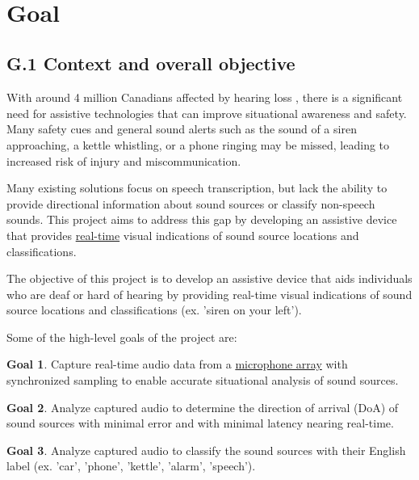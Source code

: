 \documentclass[12pt]{article}
\theoremstyle{definition}
\newtheorem{goal}{Goal}
\begin{document}
~\newpage


\section{Goal}

\subsection{G.1 Context and overall objective}\label{sec:G.1}

With around 4 million Canadians affected by hearing loss \cite{Healthing2025}, 
there is a significant need for assistive technologies that can improve 
situational awareness and safety. Many safety cues and general sound alerts such
as the sound of a siren approaching, a kettle whistling, or a phone ringing may be
missed, leading to increased risk of injury and miscommunication.

Many existing solutions focus on speech transcription, but lack the ability to
provide directional information about sound sources or classify non-speech
sounds. This project aims to address this gap by developing an assistive device
that provides \hyperref[def:real_time]{real-time} visual indications of sound
source locations and classifications.

The objective of this project is to develop an assistive device that aids
individuals who are deaf or hard of hearing by providing real-time visual
indications of sound source locations and classifications (ex. 'siren on your 
left').

Some of the high-level goals of the project are:

\begin{goal}\label{goal:audio_capture} Capture real-time audio data from a 
\hyperref[def:microphone_array]{microphone array}
with synchronized sampling to enable accurate situational analysis of sound
sources.
\end{goal}

\begin{goal}\label{goal:audio_direction_analysis} Analyze captured audio to
determine the direction of arrival (DoA) of sound sources with minimal error and
with minimal latency nearing real-time.
\end{goal}

\begin{goal}\label{goal:audio_identification_analysis} Analyze captured audio to
classify the sound sources with their English label (ex. 'car', 'phone',
'kettle', 'alarm', 'speech').
\end{goal}
\end{document}
